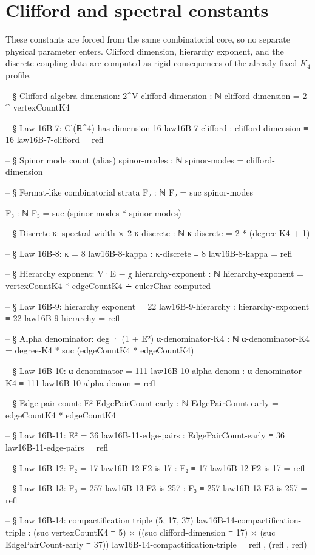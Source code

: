 \documentclass[11pt,a4paper]{book}
\begin{document}
\section{Clifford and spectral constants}

These constants are forced from the same combinatorial core, so no separate physical parameter enters. Clifford dimension, hierarchy exponent, and the discrete coupling data are computed as rigid consequences of the already fixed $K_4$ profile.

\begin{code}
-- § Clifford algebra dimension: 2^V
clifford-dimension : ℕ
clifford-dimension = 2 ^ vertexCountK4

-- § Law 16B-7: Cl(ℝ^4) has dimension 16
law16B-7-clifford : clifford-dimension ≡ 16
law16B-7-clifford = refl

-- § Spinor mode count (alias)
spinor-modes : ℕ
spinor-modes = clifford-dimension

-- § Fermat-like combinatorial strata
F₂ : ℕ
F₂ = suc spinor-modes

F₃ : ℕ
F₃ = suc (spinor-modes * spinor-modes)

-- § Discrete κ: spectral width × 2
κ-discrete : ℕ
κ-discrete = 2 * (degree-K4 + 1)

-- § Law 16B-8: κ = 8
law16B-8-kappa : κ-discrete ≡ 8
law16B-8-kappa = refl

-- § Hierarchy exponent: V·E − χ
hierarchy-exponent : ℕ
hierarchy-exponent = vertexCountK4 * edgeCountK4 ∸ eulerChar-computed

-- § Law 16B-9: hierarchy exponent = 22
law16B-9-hierarchy : hierarchy-exponent ≡ 22
law16B-9-hierarchy = refl

-- § Alpha denominator: deg · (1 + E²)
α-denominator-K4 : ℕ
α-denominator-K4 = degree-K4 * suc (edgeCountK4 * edgeCountK4)

-- § Law 16B-10: α-denominator = 111
law16B-10-alpha-denom : α-denominator-K4 ≡ 111
law16B-10-alpha-denom = refl

-- § Edge pair count: E²
EdgePairCount-early : ℕ
EdgePairCount-early = edgeCountK4 * edgeCountK4

-- § Law 16B-11: E² = 36
law16B-11-edge-pairs : EdgePairCount-early ≡ 36
law16B-11-edge-pairs = refl

-- § Law 16B-12: F₂ = 17
law16B-12-F2-is-17 : F₂ ≡ 17
law16B-12-F2-is-17 = refl

-- § Law 16B-13: F₃ = 257
law16B-13-F3-is-257 : F₃ ≡ 257
law16B-13-F3-is-257 = refl

-- § Law 16B-14: compactification triple (5, 17, 37)
law16B-14-compactification-triple :
  (suc vertexCountK4 ≡ 5) × ((suc clifford-dimension ≡ 17) × (suc EdgePairCount-early ≡ 37))
law16B-14-compactification-triple = refl , (refl , refl)
\end{code}
\end{document}
